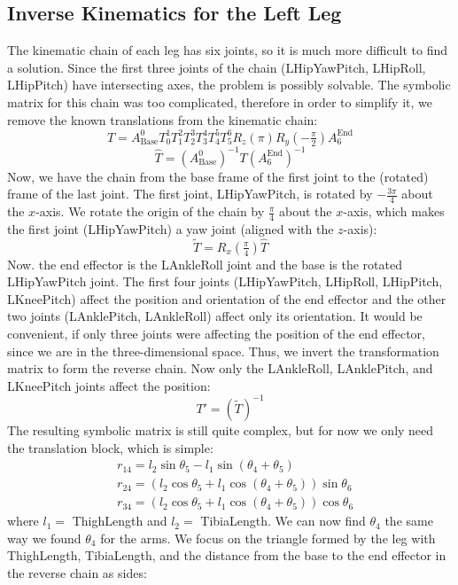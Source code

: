 \subsection{Inverse Kinematics for the Left Leg}

The kinematic chain of each leg has six joints, so it is much more difficult to find a solution. Since the first three joints of the chain (LHipYawPitch,  LHipRoll, LHipPitch) have intersecting axes, the problem is possibly solvable. The symbolic matrix for this chain was too complicated, therefore in order to simplify it, we remove the known translations from the kinematic chain:
\[
T = A^0_\text{Base}T^1_0T^2_1T^3_2T^4_3T^5_4T^6_5R_z(\pi)R_y(-\tfrac{\pi}{2})A^\text{End}_6
\]
\[
\widehat{T} = {\left(A^0_\text{Base}\right)}^{-1}T{\left(A^\text{End}_6\right)}^{-1}
\]
Now, we have the chain from the base frame of the first joint to the (rotated) frame of the last joint. The first joint, LHipYawPitch, is rotated by $-\frac{3\pi}{4} $ about the $ x $-axis. We rotate the origin of the chain by $\frac{\pi}{4}$ about the $x$-axis, which makes the first joint (LHipYawPitch) a yaw joint (aligned with the $z$-axis):
\[
\widetilde{T} = R_x(\tfrac{\pi}{4})\widehat{T}
\]
Now. the end effector is the LAnkleRoll joint and the base is the rotated LHipYawPitch joint. The first four joints (LHipYawPitch, LHipRoll, LHipPitch, LKneePitch) affect the position and orientation of the end effector and the other two joints (LAnklePitch, LAnkleRoll) affect only its orientation. It would be convenient, if only three joints were affecting the position of the end effector, since we are in the three-dimensional space. Thus, we invert the transformation matrix to form the reverse chain. Now only the LAnkleRoll, LAnklePitch, and LKneePitch joints affect the position:
\[
T' = {\left(\widetilde{T}\right)}^{-1}
\]
The resulting symbolic matrix is still quite complex, but for now we only need the translation block, which is simple:
\begin{align*}
&r_{14} = l_2\sin\theta_5 - l_1\sin\left(\theta_4 + \theta_5\right)\\
&r_{24} = \left(l_2\cos\theta_5 + l_1 \cos\left(\theta_4 + \theta_5\right)\right)\sin\theta_6\\
&r_{34} = \left(l_2\cos\theta_5 + l_1 \cos\left(\theta_4 + \theta_5\right)\right)\cos\theta_6
\end{align*}
where $l_1 =$ ThighLength and $l_2 =$ TibiaLength.
We can now find $\theta_4$ the same way we found $\theta_4$ for the arms. We focus on the triangle formed by the leg with  ThighLength, TibiaLength, and the distance from the base to the end effector in the reverse chain as sides:
